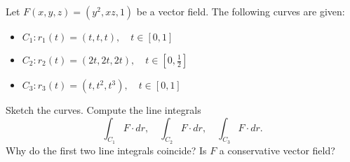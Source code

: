 \begin{exercise}
	Let $ F(x,y,z) = (y^2, xz, 1) $ be a vector field. The following curves are given:
	\begin{itemize}
		\item $ C_1: r_1(t) = (t, t, t), \quad t \in [0,1] $
		\item $ C_2: r_2(t) = (2t, 2t, 2t), \quad t \in [0, \frac{1}{2}] $
		\item $ C_3: r_3(t) = (t, t^2, t^3), \quad t \in [0,1] $
	\end{itemize}
	Sketch the curves. Compute the line integrals
	$$
		\int_{C_1} F \cdot dr, \quad \int_{C_2} F \cdot dr, \quad \int_{C_3} F \cdot dr.
	$$
	Why do the first two line integrals coincide? Is $F$ a conservative vector field?
\end{exercise}

